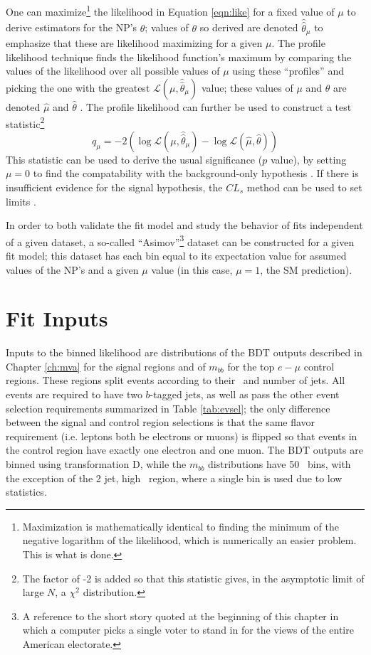 One can maximize\footnote{Maximization is mathematically identical to finding the minimum of the negative logarithm of the likelihood, which is numerically an easier problem.  This is what is done.} the likelihood in Equation \ref{eqn:like} for a fixed value of $\mu$ to derive estimators for the NP's $\theta$; values of $\theta$ so derived are denoted $\hat{\hat{\theta}}_{\mu}$ to emphasize that these are likelihood maximizing for a given $\mu$.  The profile likelihood technique finds the likelihood function's maximum by comparing the values of the likelihood over all possible values of $\mu$ using these ``profiles'' and picking the one with the greatest $\mathcal{L}\left(\mu,\hat{\hat{\theta}}_{\mu}\right)$ value; these values of $\mu$ and $\theta$ are denoted $\hat{\mu}$ and $\hat{\theta}$ .  The profile likelihood can further be used to construct a test statistic\footnote{The factor of -2 is added so that this statistic gives, in the asymptotic limit of large $N$, a $\chi^2$ distribution.}
\begin{equation}
\label{eqn:teststat}
q_{\mu}=-2\left(\log\mathcal{L}\left(\mu,\hat{\hat{\theta}}_{\mu}\right)-\log\mathcal{L}\left(\hat{\mu},\hat{\theta}\right)\right)
\end{equation}
This statistic can be used to derive the usual significance ($p$ value), by setting $\mu=0$ to find the compatability with the background-only hypothesis \cite{asimov}.  If there is insufficient evidence for the signal hypothesis, the $CL_s$ method can be used to set limits \cite{cls_read}.

In order to both validate the fit model and study the behavior of fits independent of a given dataset, a so-called ``Asimov''\footnote{A reference to the short story quoted at the beginning of this chapter in which a computer picks a single voter to stand in for the views of the entire American electorate.} dataset can be constructed for a given fit model; this dataset has each bin equal to its expectation value for assumed values of the NP's and a given $\mu$ value (in this case, $\mu=1$, the SM prediction).

\section{Fit Inputs}
\label{ssec:inputs}
Inputs to the binned likelihood are distributions of the BDT outputs described in Chapter \ref{ch:mva} for the signal regions and of $m_{bb}$ for the top $e-\mu$ control regions.  These regions split events according to their \ptv\, and number of jets.  All events are required to have two $b$-tagged jets, as well as pass the other event selection requirements summarized in Table \ref{tab:evsel}; the only difference between the signal and control region selections is that the same flavor requirement (i.e. leptons both be electrons or muons) is flipped so that events in the control region have exactly one electron and one muon.  The BDT outputs are binned using transformation D, while the $m_{bb}$ distributions have 50 \GeV\, bins, with the exception of the 2 jet, high \ptv\, region, where a single bin is used due to low statistics.

